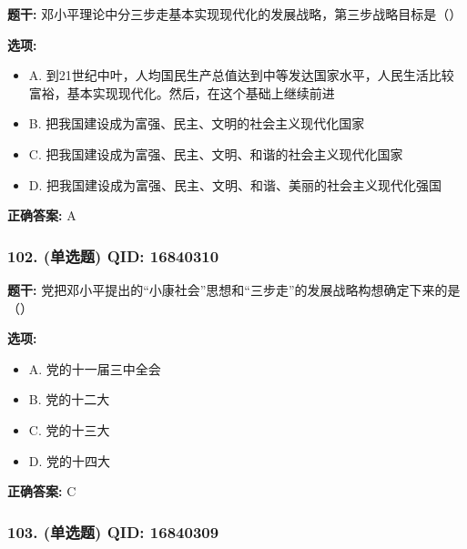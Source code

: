 \documentclass[12pt,UTF8]{ctexart}
\begin{document}
\textbf{题干:}
邓小平理论中分三步走基本实现现代化的发展战略，第三步战略目标是（）

\textbf{选项:}
\begin{itemize}[leftmargin=*]

  \item A. 到21世纪中叶，人均国民生产总值达到中等发达国家水平，人民生活比较富裕，基本实现现代化。然后，在这个基础上继续前进

  \item B. 把我国建设成为富强、民主、文明的社会主义现代化国家

  \item C. 把我国建设成为富强、民主、文明、和谐的社会主义现代化国家

  \item D. 把我国建设成为富强、民主、文明、和谐、美丽的社会主义现代化强国

\end{itemize}

\textbf{正确答案:}
A

\vspace{0.3em}\hrulefill\vspace{0.7em}

\subsubsection*{102. (单选题) \small QID: 16840310}

\textbf{题干:}
党把邓小平提出的“小康社会”思想和“三步走”的发展战略构想确定下来的是（）

\textbf{选项:}
\begin{itemize}[leftmargin=*]

  \item A. 党的十一届三中全会

  \item B. 党的十二大

  \item C. 党的十三大

  \item D. 党的十四大

\end{itemize}

\textbf{正确答案:}
C

\vspace{0.3em}\hrulefill\vspace{0.7em}

\subsubsection*{103. (单选题) \small QID: 16840309}
\end{document}

